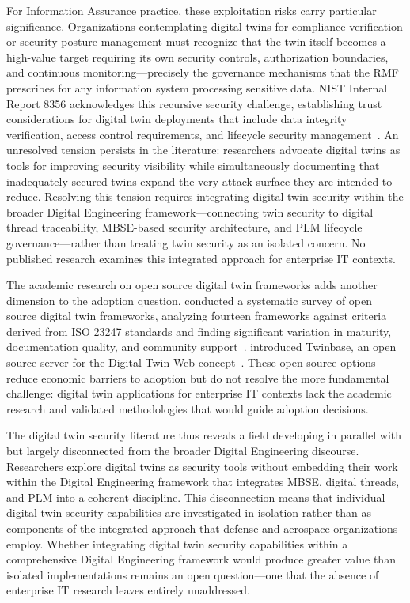 For Information Assurance practice, these exploitation risks carry particular significance. Organizations contemplating digital twins for compliance verification or security posture management must recognize that the twin itself becomes a high-value target requiring its own security controls, authorization boundaries, and continuous monitoring---precisely the governance mechanisms that the RMF prescribes for any information system processing sensitive data. NIST Internal Report 8356 acknowledges this recursive security challenge, establishing trust considerations for digital twin deployments that include data integrity verification, access control requirements, and lifecycle security management~\parencite{NIST_IR_8356_2025}. An unresolved tension persists in the literature: researchers advocate digital twins as tools for improving security visibility while simultaneously documenting that inadequately secured twins expand the very attack surface they are intended to reduce. Resolving this tension requires integrating digital twin security within the broader Digital Engineering framework---connecting twin security to digital thread traceability, MBSE-based security architecture, and PLM lifecycle governance---rather than treating twin security as an isolated concern. No published research examines this integrated approach for enterprise IT contexts.

The academic research on open source digital twin frameworks adds another dimension to the adoption question. \citeauthor{Gil_2024} conducted a systematic survey of open source digital twin frameworks, analyzing fourteen frameworks against criteria derived from ISO 23247 standards and finding significant variation in maturity, documentation quality, and community support~\parencite{Gil_2024}. \citeauthor{Autiosalo_Siegel_Tammi_2021} introduced Twinbase, an open source server for the Digital Twin Web concept~\parencite{Autiosalo_Siegel_Tammi_2021}. These open source options reduce economic barriers to adoption but do not resolve the more fundamental challenge: digital twin applications for enterprise IT contexts lack the academic research and validated methodologies that would guide adoption decisions.

The digital twin security literature thus reveals a field developing in parallel with but largely disconnected from the broader Digital Engineering discourse. Researchers explore digital twins as security tools without embedding their work within the Digital Engineering framework that integrates MBSE, digital threads, and PLM into a coherent discipline. This disconnection means that individual digital twin security capabilities are investigated in isolation rather than as components of the integrated approach that defense and aerospace organizations employ. Whether integrating digital twin security capabilities within a comprehensive Digital Engineering framework would produce greater value than isolated implementations remains an open question---one that the absence of enterprise IT research leaves entirely unaddressed.

